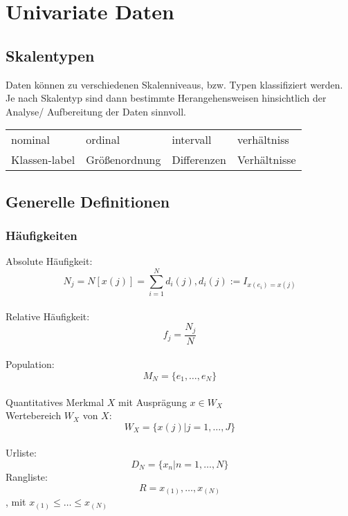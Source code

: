 \section{Univariate Daten}

\subsection{Skalentypen}

Daten können zu verschiedenen Skalenniveaus, bzw. Typen klassifiziert werden.
    Je nach Skalentyp sind dann bestimmte Herangehensweisen hinsichtlich der
    Analyse/ Aufbereitung der Daten sinnvoll.\\

\begin{tabular}{llll}
    nominal             & ordinal            & intervall         & verhältniss\\
    Klassen-label       & Größenordnung      & Differenzen       & Verhältnisse\\
\end{tabular}

\subsection{Generelle Definitionen}
\subsubsection{Häufigkeiten}
Absolute Häufigkeit:\\
$$
    N_j = N[x(j)] = \sum_{i=1}^N d_i(j), d_i(j) := I_{x(e_i) = x(j)}
$$
\\
Relative Häufigkeit:\\
$$
    f_j = \frac{N_j}{N}
$$
\\
Population:\\
$$
    M_N = \{e_1, \ldots, e_N\}
$$
\\
Quantitatives Merkmal $X$ mit Ausprägung $x \in W_X$\\
Wertebereich $W_X$ von $X$:\\
$$
    W_X = \{x(j) | j=1, \ldots, J\}
$$
\\
Urliste:
$$
    D_N = \{x_n | n=1, \ldots, N\}
$$
Rangliste:\\
$$
    R = x_{(1)}, \ldots, x_{(N)} 
$$
, mit  $x_{(1)} \leq \ldots \leq x_{(N)}$\\
